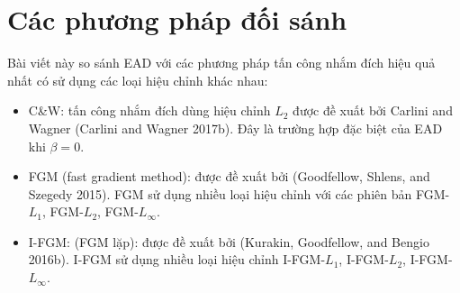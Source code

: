 \section{Các phương pháp đối sánh}
Bài viết này so sánh EAD với các phương pháp tấn công nhắm đích hiệu quả nhất có sử dụng 
các loại hiệu chỉnh khác nhau:
\begin{itemize}
    \item C\&W: tấn công nhắm đích dùng hiệu chỉnh $L_2$ được đề xuất bởi Carlini and Wagner (Carlini and Wagner 2017b). Đây là trường hợp đặc biệt của EAD khi $\beta = 0$.
    \item FGM (fast gradient method): được đề xuất bởi (Goodfellow, Shlens, and Szegedy 2015). FGM sử dụng nhiều loại hiệu chỉnh với các phiên bản FGM-$L_1$, FGM-$L_2$, FGM-$L_{\infty}$.
    \item I-FGM: (FGM lặp): được đề xuất bởi (Kurakin, Goodfellow, and Bengio 2016b). I-FGM sử dụng nhiều loại hiệu chỉnh I-FGM-$L_1$, I-FGM-$L_2$, I-FGM-$L_{\infty}$.
\end{itemize}